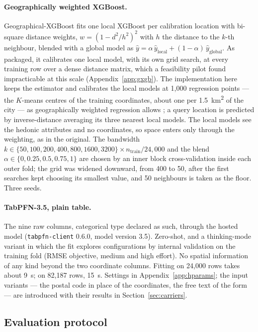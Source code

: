 \documentclass[11pt,a4paper]{article}
\begin{document}
\paragraph{Geographically weighted XGBoost.} Geographical-XGBoost \citep{grekousis2025} fits one
local XGBoost per calibration location with bi-square distance weights,
$w = (1 - d^2/h^2)^2$ with $h$ the distance to the $k$-th neighbour, blended with a global model
as $\hat y = \alpha\,\hat y_{\text{local}} + (1 - \alpha)\,\hat y_{\text{global}}$. As packaged,
it calibrates one local model, with its own grid search, at every training row over a dense
distance matrix, which a feasibility pilot found impracticable at this scale
(Appendix~\ref{app:gxgb}). The implementation here keeps the estimator and calibrates the local
models at 1{,}000 regression points --- the $K$-means centres of the training coordinates, about
one per 1.5~km\textsuperscript{2} of the city --- as geographically weighted regression allows
\citep{fotheringham2002}; a query location is predicted by inverse-distance averaging its three
nearest local models. The local models see the hedonic attributes and no coordinates, so space
enters only through the weighting, as in the original. The bandwidth
$k \in \{50, 100, 200, 400, 800, 1600, 3200\} \times n_{\text{train}}/24{,}000$ and the blend
$\alpha \in \{0, 0.25, 0.5, 0.75, 1\}$ are chosen by an inner block cross-validation inside each
outer fold; the grid was widened downward, from 400 to 50, after the first searches kept
choosing its smallest value, and 50 neighbours is taken as the floor. Three seeds.

\paragraph{TabPFN-3.5, plain table.} The nine raw columns, categorical type declared as such,
through the hosted model (\texttt{tabpfn-client} 0.6.0, model version 3.5). Zero-shot, and a
thinking-mode variant in which the fit explores configurations by internal validation on the
training fold (RMSE objective, medium and high effort). No spatial information of any kind
beyond the two coordinate columns. Fitting on 24{,}000 rows takes about 9~s; on 82{,}187 rows,
15~s. Settings in Appendix~\ref{app:hparams}; the input variants --- the postal code in place of
the coordinates, the free text of the form --- are introduced with their results in
Section~\ref{sec:carriers}.

\subsection{Evaluation protocol}
\end{document}
